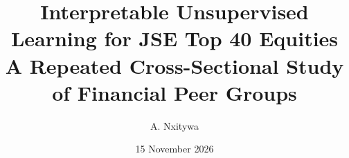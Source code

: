 

\title{Interpretable Unsupervised Learning for JSE Top 40 Equities\\[5pt]\large A Repeated Cross-Sectional Study of Financial Peer Groups}\author{A. Nxitywa}\date{15 November 2026}\maketitle



\FloatBarrier


\FloatBarrier


\FloatBarrier


\FloatBarrier


\FloatBarrier


\FloatBarrier


\FloatBarrier


\FloatBarrier


\FloatBarrier

\FloatBarrier


